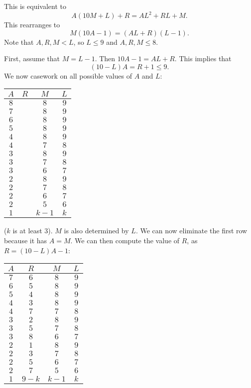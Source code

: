 This is equivalent to \[A\left(10M+L\right)+R=AL^2+RL+M.\] This rearranges to \[M\left(10A-1\right)=\left(AL+R\right)\left(L-1\right).\] Note that $A,R,M<L$, so $L\leq 9$ and $A,R,M\leq8$.

First, assume that $M=L-1$. Then $10A-1=AL+R$. This implies that \[\left(10-L\right)A=R+1\leq9.\] We now casework on all possible values of $A$ and $L$:

\begin{center}
\begin{tabular}{c|c|c|c} 
$A$ & $R$ & $M$ & $L$ \\ \hline
$8$ & & $8$ & $9$ \\
$7$ & & $8$ & $9$ \\
$6$ & & $8$ & $9$ \\
$5$ & & $8$ & $9$ \\
$4$ & & $8$ & $9$ \\
$4$ & & $7$ & $8$ \\
$3$ & & $8$ & $9$ \\
$3$ & & $7$ & $8$ \\
$3$ & & $6$ & $7$ \\
$2$ & & $8$ & $9$ \\
$2$ & & $7$ & $8$ \\
$2$ & & $6$ & $7$ \\
$2$ & & $5$ & $6$ \\
$1$ & & $k-1$ & $k$ \\
\end{tabular}
\end{center}

($k$ is at least $3$). $M$ is also determined by $L$. We can now eliminate the first row because it has $A=M$. We can then compute the value of $R$, as $R=\left(10-L\right)A-1$:

\begin{center}
\begin{tabular}{c|c|c|c} 
$A$ & $R$ & $M$ & $L$ \\ \hline
$7$ & $6$ & $8$ & $9$ \\
$6$ & $5$ & $8$ & $9$ \\
$5$ & $4$ & $8$ & $9$ \\
$4$ & $3$ & $8$ & $9$ \\
$4$ & $7$ & $7$ & $8$ \\
$3$ & $2$ & $8$ & $9$ \\
$3$ & $5$ & $7$ & $8$ \\
$3$ & $8$ & $6$ & $7$ \\
$2$ & $1$ & $8$ & $9$ \\
$2$ & $3$ & $7$ & $8$ \\
$2$ & $5$ & $6$ & $7$ \\
$2$ & $7$ & $5$ & $6$ \\
$1$ & $9-k$ & $k-1$ & $k$ \\
\end{tabular}
\end{center}

